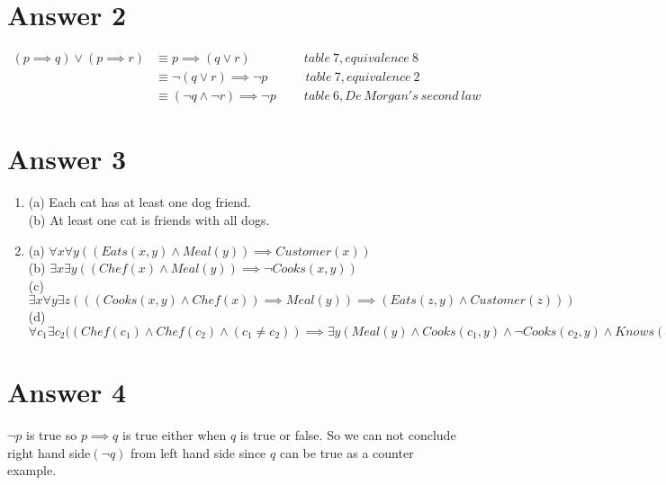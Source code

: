 \documentclass[12pt]{article}
\begin{document}
\section*{Answer 2}
\begin{equation} 
\begin{split}
 (p \implies q) \lor (p \implies r) &\equiv p \implies (q \lor r) \qquad \qquad \ table\ 7, equivalence \ 8\\
 &\equiv \neg(q \lor r) \implies \neg p \qquad \quad table\ 7, equivalence\ 2\\
 &\equiv (\neg q \land \neg r) \implies \neg p \qquad \ table\ 6, De\ Morgan's\ second \ law
\end{split}
\end{equation}
\newpage 
\section*{Answer 3}
\begin{enumerate}
	\item
	(a) Each cat has at least one dog friend.\\
	(b) At least one cat is friends with all dogs.
	\item 
	(a) $\forall x \forall y ((Eats(x,y) \land Meal(y)) \implies Customer(x)) $ \\
	(b) $ \exists x \exists y ((Chef(x) \land Meal(y)) \implies \neg Cooks(x,y))$\\
	(c) $ \exists x \forall y \exists z (((Cooks(x,y) \land Chef(x)) \implies Meal(y))\implies (Eats(z,y) \land Customer(z)))$ \\
	(d)  $ \forall c_1 \exists c_2 ( (Chef(c_1) \land Chef(c_2) \land (c_1 \neq c_2)) \implies \exists y (Meal(y) \land Cooks(c_1,y) \land \neg Cooks(c_2,y) \land Knows (c_1,c_2) ) $
	
\end{enumerate}


\section*{Answer 4}
$ \neg p$ is true so $ p \implies q$ is true either when $ q $ is true or false. So we can not conclude right hand side$( \neg q )$ from left hand side since $ q $ can be true as a counter example.
\end{document}

